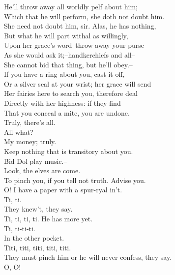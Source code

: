 \documentclass{memoir}
\begin{document}
\begin{drama*}
 He'll throw away all worldly pelf about him;\\
 Which that he will perform, she doth not doubt him.\\
\facespeaks  She need not doubt him, sir. Alas, he has nothing,\\
 But what he will part withal as willingly,\\
 Upon her grace's word--throw away your purse--\\
 As she would ask it;--handkerchiefs and all--\\
 She cannot bid that thing, but he'll obey.--\\
 If you have a ring about you, cast it off,\\
 Or a silver seal at your wrist; her grace will send\\
 Her fairies here to search you, therefore deal\\
 Directly with her highness: if they find\\
 That you conceal a mite, you are undone.\\
\dapperspeaks  Truly, there's all.\\
\facespeaks {} All what?\\
\dapperspeaks {} My money; truly.\\
\facespeaks  Keep nothing that is transitory about you.\\
 Bid Dol play music.--\\
 Look, the elves are come.\\
 To pinch you, if you tell not truth. Advise you.\\
\dapperspeaks  O! I have a paper with a spur-ryal in't.\\
\facespeaks  Ti, ti.\\
 They knew't, they say.\\
\subtlespeaks {} Ti, ti, ti, ti. He has more yet.\\
\facespeaks  Ti, ti-ti-ti.\\
 In the other pocket.\\
\subtlespeaks {} Titi, titi, titi, titi, titi.\\
 They must pinch him or he will never confess, they say.\\
\dapperspeaks  O, O!\\

\end{drama*}
\end{document}
